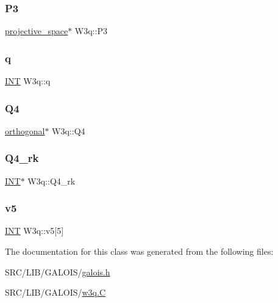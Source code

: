 \mbox{\label{class_w3q_ae33352a370c2aa0b27d215fe0796cc95}} 
\subsubsection{\texorpdfstring{P3}{P3}}
{\footnotesize\ttfamily \mbox{\hyperlink{classprojective__space}{projective\+\_\+space}}$\ast$ W3q\+::\+P3}

\mbox{\label{class_w3q_a776faf2ab49c48556d6f3be9e22e9579}} 
\subsubsection{\texorpdfstring{q}{q}}
{\footnotesize\ttfamily \mbox{\hyperlink{galois_8h_a09fddde158a3a20bd2dcadb609de11dc}{I\+NT}} W3q\+::q}

\mbox{\label{class_w3q_ab09a67790be11093f04f51d99869eb73}} 
\subsubsection{\texorpdfstring{Q4}{Q4}}
{\footnotesize\ttfamily \mbox{\hyperlink{classorthogonal}{orthogonal}}$\ast$ W3q\+::\+Q4}

\mbox{\label{class_w3q_a31138a0a1d0d691136d18ac58ea1e0ee}} 
\subsubsection{\texorpdfstring{Q4\+\_\+rk}{Q4\_rk}}
{\footnotesize\ttfamily \mbox{\hyperlink{galois_8h_a09fddde158a3a20bd2dcadb609de11dc}{I\+NT}}$\ast$ W3q\+::\+Q4\+\_\+rk}

\mbox{\label{class_w3q_a77a4101e40ff9a9c1a73eb1d6bcbc9fc}} 
\subsubsection{\texorpdfstring{v5}{v5}}
{\footnotesize\ttfamily \mbox{\hyperlink{galois_8h_a09fddde158a3a20bd2dcadb609de11dc}{I\+NT}} W3q\+::v5\mbox{[}5\mbox{]}}



The documentation for this class was generated from the following files\+:\begin{DoxyCompactItemize}
\item 
S\+R\+C/\+L\+I\+B/\+G\+A\+L\+O\+I\+S/\mbox{\hyperlink{galois_8h}{galois.\+h}}\item 
S\+R\+C/\+L\+I\+B/\+G\+A\+L\+O\+I\+S/\mbox{\hyperlink{w3q_8_c}{w3q.\+C}}\end{DoxyCompactItemize}

